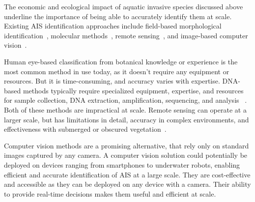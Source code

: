 \documentclass[final,3p,times,twocolumn]{elsarticle}
\begin{document}

The economic and ecological impact of aquatic invasive species discussed above underline the importance of being able to accurately identify them at scale. Existing AIS identification approaches include field-based morphological identification~\cite{dehez2023investigation}, molecular methods~\cite{angles2019detection, ghahramanzadeh2013efficient, scriver2015development}, remote sensing~\cite{brooks2019implementing, unitis2018remote, jochems4883509active}, and image-based computer vision~\cite{wang2026realtime}.


Human eye-based classification from botanical knowledge or experience is the most common method in use today, as it doesn't require any equipment or resources. But it is time-consuming, and accuracy varies with expertise. DNA-based methods typically require specialized equipment, expertise, and resources for sample collection, DNA extraction, amplification, sequencing, and analysis ~\cite{angles2019detection, ghahramanzadeh2013efficient}. Both of these methods are impractical at scale. Remote sensing can operate at a larger scale, but has limitations in detail, accuracy in complex environments, and effectiveness with submerged or obscured vegetation~\cite{brooks2019implementing, unitis2018remote, jochems4883509active}. 


Computer vision methods are a promising alternative, that rely only on standard images captured by any camera. A computer vision solution could potentially be deployed on devices ranging from smartphones to underwater robots, enabling efficient and accurate identification of AIS at a large scale. They are cost-effective and accessible as they can be deployed on any device with a camera. Their ability to provide real-time decisions makes them useful and efficient at scale. 
\end{document}
